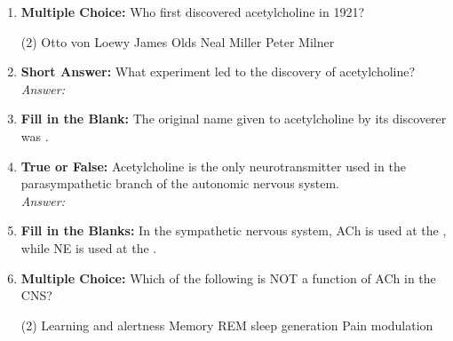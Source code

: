 \begin{enumerate}[label=\textbf{Q3.4.\arabic*}]
    \item \textbf{Multiple Choice:} Who first discovered acetylcholine in 1921?
        \begin{tasks}[label=\textcolor{\documentTheme}{(\Alph*)}, item-format=\color{\documentTheme}, label-width=1.5em, item-indent=1.7em](2)
            \task Otto von Loewy
            \task James Olds
            \task Neal Miller
            \task Peter Milner
        \end{tasks}

    \item \textbf{Short Answer:} What experiment led to the discovery of acetylcholine? \\
        \textit{Answer:} %

    \item \textbf{Fill in the Blank:} The original name given to acetylcholine by its discoverer was \underline{\hspace{3cm}}.

    \item \textbf{True or False:} Acetylcholine is the only neurotransmitter used in the parasympathetic branch of the autonomic nervous system. \\
        \textit{Answer:} %

    \item \textbf{Fill in the Blanks:} In the sympathetic nervous system, ACh is used at the \underline{\hspace{3cm}}, while NE is used at the \underline{\hspace{3cm}}.

    \item \textbf{Multiple Choice:} Which of the following is NOT a function of ACh in the CNS?
        \begin{tasks}[label=\textcolor{\documentTheme}{(\Alph*)}, item-format=\color{\documentTheme}, label-width=1.5em, item-indent=1.7em](2)
            \task Learning and alertness
            \task Memory
            \task REM sleep generation
            \task Pain modulation
        \end{tasks}


\end{enumerate}
